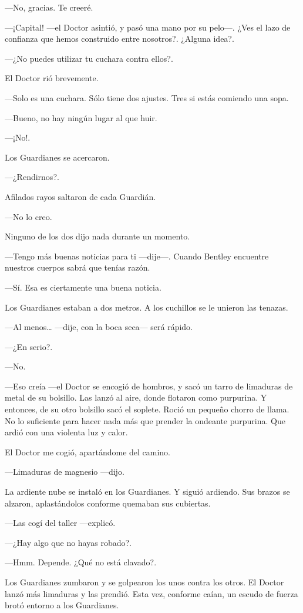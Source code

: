---No, gracias. Te creeré.

---¡Capital! ---el Doctor asintió, y pasó una mano por su pelo---. ¿Ves
el lazo de confianza que hemos construido entre nosotros?. ¿Alguna
idea?.

---¿No puedes utilizar tu cuchara contra ellos?.

El Doctor rió brevemente.

---Solo es una cuchara. Sólo tiene dos ajustes. Tres si estás comiendo
una sopa.

---Bueno, no hay ningún lugar al que huir.

---¡No!.

Los Guardianes se acercaron.

---¿Rendirnos?.

Afilados rayos saltaron de cada Guardián.

---No lo creo.

Ninguno de los dos dijo nada durante un momento.

---Tengo más buenas noticias para ti ---dije---. Cuando Bentley
encuentre nuestros cuerpos sabrá que tenías razón.

---Sí. Esa es ciertamente una buena noticia.

Los Guardianes estaban a dos metros. A los cuchillos se le unieron las
tenazas.

---Al menos\ldots{} ---dije, con la boca seca--- será rápido.

---¿En serio?.

---No.

---Eso creía ---el Doctor se encogió de hombros, y sacó un tarro de
limaduras de metal de su bolsillo. Las lanzó al aire, donde flotaron
como purpurina. Y entonces, de su otro bolsillo sacó el soplete. Roció
un pequeño chorro de llama. No lo suficiente para hacer nada más que
prender la ondeante purpurina. Que ardió con una violenta luz y calor.

El Doctor me cogió, apartándome del camino.

---Limaduras de magnesio ---dijo.

La ardiente nube se instaló en los Guardianes. Y siguió ardiendo. Sus
brazos se alzaron, aplastándolos conforme quemaban sus cubiertas.

---Las cogí del taller ---explicó.

---¿Hay algo que no hayas robado?.

---Hmm. Depende. ¿Qué no está clavado?.

Los Guardianes zumbaron y se golpearon los unos contra los otros. El
Doctor lanzó más limaduras y las prendió. Esta vez, conforme caían, un
escudo de fuerza brotó entorno a los Guardianes.

